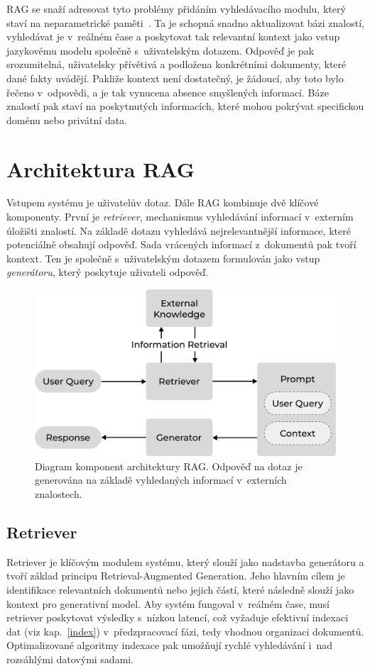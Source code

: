 RAG se snaží adresovat tyto problémy přidáním vyhledávacího modulu, který staví na neparametrické paměti~\cite{lewis2020_retrieval_augmented_generation}. Ta je schopná snadno aktualizovat bázi znalostí, vyhledávat je v~reálném čase a poskytovat tak relevantní kontext jako vstup jazykovému modelu společně s~uživatelským dotazem. Odpověď je pak srozumitelná, uživatelsky přívětivá a podložena konkrétními dokumenty, které dané fakty uvádějí. Pakliže kontext není dostatečný, je žádoucí, aby toto bylo řečeno v~odpovědi, a je tak vynucena absence smyšlených informací. Báze znalostí pak staví na poskytnutých informacích, které mohou pokrývat specifickou doménu nebo privátní data.

\section{Architektura RAG}
Vstupem systému je uživatelův dotaz. Dále RAG kombinuje dvě klíčové komponenty. První je \textit{retriever}, mechanismus vyhledávání informací v~externím úložišti znalostí. Na základě dotazu vyhledává nejrelevantnější informace, které potenciálně obsahují odpověď. Sada vrácených informací z~dokumentů pak tvoří kontext. Ten je společně s~uživatelským dotazem formulován jako vstup \textit{generátoru}, který poskytuje uživateli odpověď.

\begin{figure}[H]
    \centering
    \includegraphics[width=0.7\linewidth]{obrazky/rag.pdf}
    \caption{Diagram komponent architektury RAG. Odpověď na dotaz je generována na základě vyhledaných informací v~externích znalostech.}
    \label{fig:komponenty}
\end{figure}

\subsection{Retriever}
Retriever je klíčovým modulem systému, který slouží jako nadstavba generátoru a tvoří základ principu Retrieval-Augmented Generation. Jeho hlavním cílem je identifikace relevantních dokumentů nebo jejich částí, které následně slouží jako kontext pro generativní model. Aby systém fungoval v~reálném čase, musí retriever poskytovat výsledky s~nízkou latencí, což vyžaduje efektivní indexaci dat (viz kap.~\ref{index}) v~předzpracovací fázi, tedy vhodnou organizaci dokumentů. Optimalizované algoritmy indexace pak umožňují rychlé vyhledávání i~nad rozsáhlými datovými sadami.

